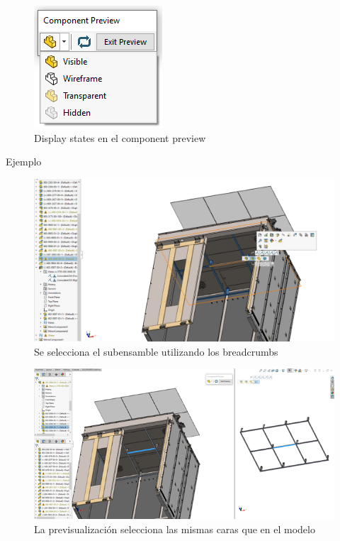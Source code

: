 \documentclass[12pt,letterpaper,final]{report}
\begin{document}
\begin{figure}[H]
	\centering
	\includegraphics[width=0.45\linewidth, height=0.5\textheight,keepaspectratio]{Imagenes/solidworks_componentpreview_02}
	\caption{Display states en el component preview}
	\label{fig:solidworkscomponentpreview02}
\end{figure}

{\LARGE Ejemplo}

\begin{figure}[H]
	\centering
	\includegraphics[width=0.85\linewidth, height=0.5\textheight,keepaspectratio]{Imagenes/solidworks_componentpreview_03}
	\caption{Se selecciona el subensamble utilizando los breadcrumbs}
	\label{fig:solidworkscomponentpreview03}
\end{figure}

\begin{figure}[H]
	\centering
	\includegraphics[width=0.85\linewidth, height=0.5\textheight,keepaspectratio]{Imagenes/solidworks_componentpreview_04}
	\caption{La previsualización selecciona las mismas caras que en el modelo}
	\label{fig:solidworkscomponentpreview43}
\end{figure}
\end{document}
